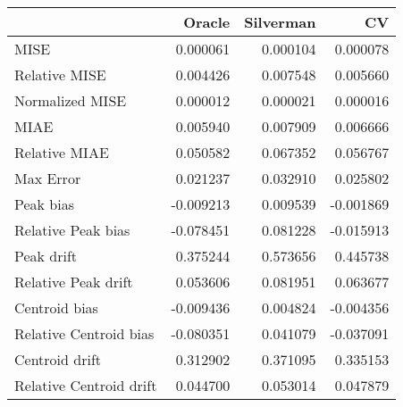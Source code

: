 \begin{tabular}{lrrr}
  \hline
 & Oracle & Silverman & CV \\ 
  \hline
MISE & 0.000061 & 0.000104 & 0.000078 \\ 
  Relative MISE & 0.004426 & 0.007548 & 0.005660 \\ 
  Normalized MISE & 0.000012 & 0.000021 & 0.000016 \\ 
  MIAE & 0.005940 & 0.007909 & 0.006666 \\ 
  Relative MIAE & 0.050582 & 0.067352 & 0.056767 \\ 
  Max Error & 0.021237 & 0.032910 & 0.025802 \\ 
  Peak bias & -0.009213 & 0.009539 & -0.001869 \\ 
  Relative Peak bias & -0.078451 & 0.081228 & -0.015913 \\ 
  Peak drift & 0.375244 & 0.573656 & 0.445738 \\ 
  Relative Peak drift & 0.053606 & 0.081951 & 0.063677 \\ 
  Centroid bias & -0.009436 & 0.004824 & -0.004356 \\ 
  Relative Centroid bias & -0.080351 & 0.041079 & -0.037091 \\ 
  Centroid drift & 0.312902 & 0.371095 & 0.335153 \\ 
  Relative Centroid drift & 0.044700 & 0.053014 & 0.047879 \\ 
   \hline
\end{tabular}
